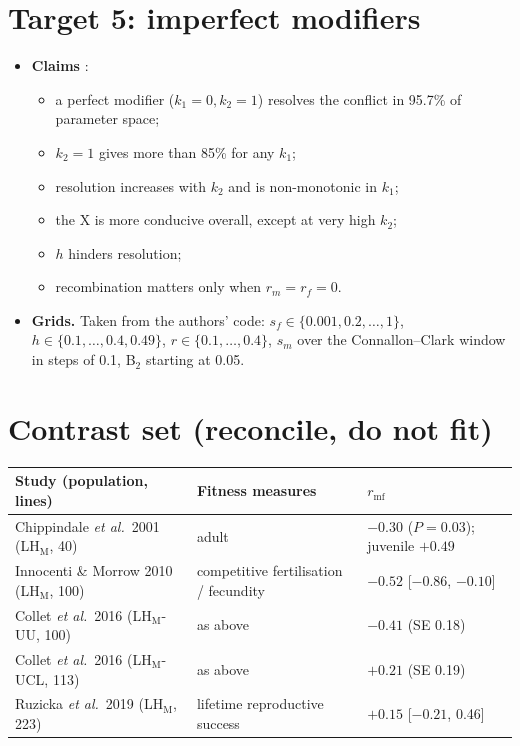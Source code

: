 \section{Target 5: imperfect modifiers}
\begin{itemize}
\item \textbf{Claims} \claimA:
  \begin{itemize}
  \item a perfect modifier ($k_1=0,k_2=1$) resolves the conflict in 95.7\% of parameter space;
  \item $k_2=1$ gives more than 85\% for any $k_1$;
  \item resolution increases with $k_2$ and is non-monotonic in $k_1$;
  \item the X is more conducive overall, except at very high $k_2$;
  \item $h$ hinders resolution;
  \item recombination matters only when $r_m=r_f=0$.
  \end{itemize}
\item \textbf{Grids.} Taken from the authors' code: $s_f\in\{0.001,0.2,\dots,1\}$, $h\in\{0.1,\dots,0.4,0.49\}$, $r\in\{0.1,\dots,0.4\}$, $s_m$ over the Connallon--Clark window in steps of 0.1, B$_2$ starting at 0.05.
\end{itemize}

\section{Contrast set (reconcile, do not fit)}
\begin{tabularx}{\textwidth}{lXl}\toprule
Study (population, lines) & Fitness measures & $r_{\mathrm{mf}}$\\\midrule
Chippindale \emph{et al.}\ 2001 (LH$_\mathrm{M}$, 40) & adult & $-0.30$ ($P=0.03$); juvenile $+0.49$\\
Innocenti \& Morrow 2010 (LH$_\mathrm{M}$, 100) & competitive fertilisation / fecundity & $-0.52$ [$-0.86$, $-0.10$]\\
Collet \emph{et al.}\ 2016 (LH$_\mathrm{M}$-UU, 100) & as above & $-0.41$ (SE 0.18)\\
Collet \emph{et al.}\ 2016 (LH$_\mathrm{M}$-UCL, 113) & as above & $+0.21$ (SE 0.19)\\
Ruzicka \emph{et al.}\ 2019 (LH$_\mathrm{M}$, 223) & lifetime reproductive success & $+0.15$ [$-0.21$, 0.46]\\\bottomrule
\end{tabularx}

